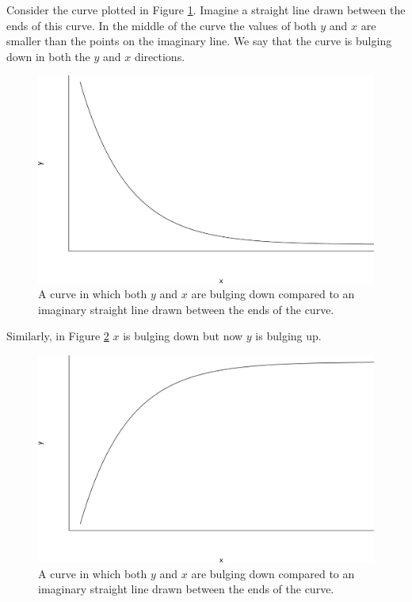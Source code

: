 \documentclass[
  british,
]{book}
\begin{document}
Consider the curve plotted in Figure \ref{fig:hollowup}. Imagine a straight line drawn between the ends of this curve. In the middle of the curve the values of both \(y\) and \(x\) are smaller than the points on the imaginary line. We say that the curve is bulging down in both the \(y\) and \(x\) directions.

\begin{figure}

{\centering \includegraphics[width=0.8\linewidth]{images/hollow_up} 

}

\caption{A curve in which both $y$ and $x$ are bulging down compared to an imaginary straight line drawn between the ends of the curve.}\label{fig:hollowup}
\end{figure}
\FloatBarrier

Similarly, in Figure \ref{fig:hollowdown} \(x\) is bulging down but now \(y\) is bulging up.

\begin{figure}

{\centering \includegraphics[width=0.8\linewidth]{images/hollow_down} 

}

\caption{A curve in which both $y$ and $x$ are bulging down compared to an imaginary straight line drawn between the ends of the curve.}\label{fig:hollowdown}
\end{figure}
\FloatBarrier
\end{document}
